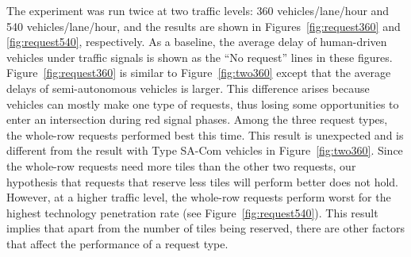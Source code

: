 The experiment was run twice at two traffic levels: 360
vehicles/lane/hour and 540 vehicles/lane/hour, and the results are
shown in Figures~\ref{fig:request360} and \ref{fig:request540},
respectively.  As a baseline, the average delay of human-driven
vehicles under traffic signals is shown as the ``No request'' lines in
these figures.  Figure~\ref{fig:request360} is similar to
Figure~\ref{fig:two360} except that the average delays of
semi-autonomous vehicles is larger. This difference arises because
vehicles can mostly make one type of requests, thus losing some
opportunities to enter an intersection during red signal phases.
Among the three request types, the whole-row requests performed best
this time.  This result is unexpected and is different from the result
with Type SA-Com vehicles in Figure~\ref{fig:two360}.  Since the
whole-row requests need more tiles than the other two requests, our
hypothesis that requests that reserve less tiles will perform better
does not hold.  However, at a higher traffic level, the whole-row
requests perform worst for the highest technology penetration rate (see
Figure~\ref{fig:request540}).  This result implies that apart from the
number of tiles being reserved, there are other factors that affect
the performance of a request type.

